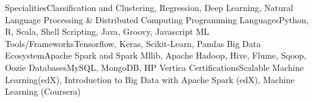 \begin{cvskills}
\cvskill
{Specialities}{Classification and Clustering, Regression, Deep Learning, Natural Language Processing \& Distributed Computing}
\cvskill
{Programming Languages}{Python, R, Scala, Shell Scripting, Java, Groovy, Javascript}
\cvskill
{ML Tools/Frameworks}{Tensorflow, Keras, Scikit-Learn, Pandas}
\cvskill
{Big Data Ecosystem}{Apache Spark and Spark Mllib, Apache Hadoop, Hive, Flume, Sqoop, Oozie}
\cvskill
{Databases}{MySQL, MongoDB, HP Vertica}
\cvskill
{Certifications}{Scalable Machine Learning(edX), Introduction to Big Data with Apache Spark (edX), Machine Learning (Coursera)}
\end{cvskills}

